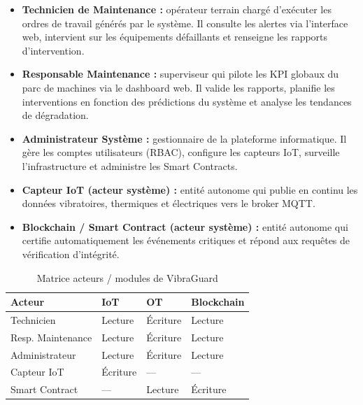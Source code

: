 \documentclass[12pt, a4paper, oneside]{report}
\begin{document}
\begin{itemize}
  \item \textbf{Technicien de Maintenance :} opérateur terrain chargé d'exécuter les ordres de
  travail générés par le système. Il consulte les alertes via l'interface web,
  intervient sur les équipements défaillants et renseigne les rapports d'intervention.

  \item \textbf{Responsable Maintenance :} superviseur qui pilote les KPI globaux du parc de
  machines via le dashboard web. Il valide les rapports, planifie les interventions en fonction
  des prédictions du système et analyse les tendances de dégradation.

  \item \textbf{Administrateur Système :} gestionnaire de la plateforme informatique. Il gère
  les comptes utilisateurs (RBAC), configure les capteurs IoT, surveille l'infrastructure et
  administre les Smart Contracts.

  \item \textbf{Capteur IoT (acteur système) :} entité autonome qui publie en continu les
  données vibratoires, thermiques et électriques vers le broker MQTT.

  \item \textbf{Blockchain / Smart Contract (acteur système) :} entité autonome qui certifie
  automatiquement les événements critiques et répond aux requêtes de vérification d'intégrité.
\end{itemize}

\begin{table}[H]
  \centering
  \begin{tabularx}{\textwidth}{L{3.5cm} C{2.5cm} C{2.5cm} C{2.5cm}}
    \toprule
    \textbf{Acteur} &
    \textbf{IoT} &
    \textbf{OT} &
    \textbf{Blockchain} \\
    \midrule
           Technicien        & Lecture  & Écriture & Lecture \\
    Resp. Maintenance & Lecture      & Écriture  & Lecture \\
           Administrateur    & Lecture  & Écriture & Lecture \\
    Capteur IoT       & Écriture & ---      & ---     \\
           Smart Contract    & ---      & Lecture  & Écriture\\
    \bottomrule
  \end{tabularx}
  \caption{Matrice acteurs / modules de VibraGuard}
\end{table}
\end{document}
